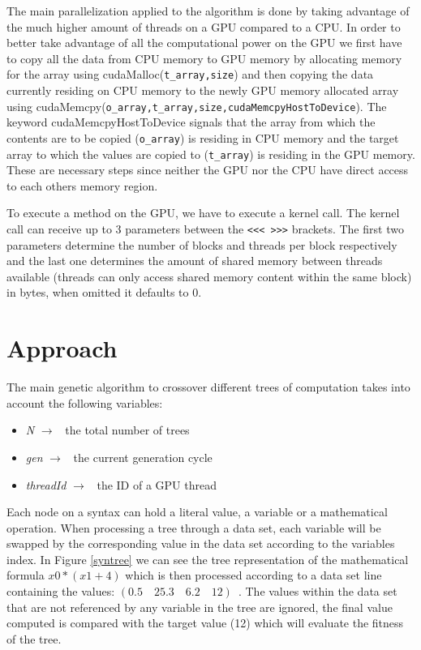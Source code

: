 \documentclass[runningheads]{llncs}
\begin{document}
The main parallelization applied to the algorithm is done by taking advantage of the much higher amount of threads on a GPU compared to a CPU. In order to better take advantage of all the computational power on the GPU we first have to copy all the data from CPU memory to GPU memory by allocating memory for the array using cudaMalloc(\texttt{t\_array,size}) and then copying the data currently residing on CPU memory to the newly GPU memory allocated array using cudaMemcpy(\texttt{o\_array,t\_array,size,cudaMemcpyHostToDevice}). The keyword cudaMemcpyHostToDevice signals that the array from which the contents are to be copied (\texttt{o\_array}) is residing in CPU memory and the target array to which the values are copied to (\texttt{t\_array}) is residing in the GPU memory. These are necessary steps since neither the GPU nor the CPU have direct access to each others memory region.

To execute a method on the GPU, we have to execute a kernel call. The kernel call can receive up to 3 parameters between the \texttt{<<< >>>} brackets. The first two parameters determine the number of blocks and threads per block respectively and the last one determines the amount of shared memory between threads available (threads can only access shared memory content within the same block) in bytes, when omitted it defaults to 0.

\section{Approach}
The main genetic algorithm to crossover different trees of computation takes into account the following variables:
\begin{itemize}
	\item \textit{N} $\rightarrow$ \ the total number of trees
	\item \textit{gen} $\rightarrow$ \ the current generation cycle
	\item \textit{threadId} $\rightarrow$ \ the ID of a GPU thread
\end{itemize}

Each node on a syntax can hold a literal value, a variable or a mathematical operation. When processing a tree through a data set, each variable will be swapped by the corresponding value in the data set according to the variables index. In Figure \ref{syntree} we can see the tree representation of the mathematical formula $x0 * (x1+4)$ which is then processed according to a data set line containing the values: $(0.5\quad 25.3\quad 6.2\quad 12)$\ . The values within the data set that are not referenced by any variable in the tree are ignored, the final value computed is compared with the target value (12) which will evaluate the fitness of the tree.
\end{document}
